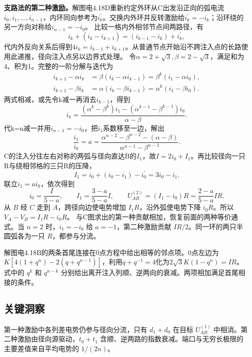 \documentclass[UTF8,fontset=fandol,a4paper,11pt]{ctexart}
\begin{document}
\textbf{支路法的第二种激励。}解图电4.18D重新约定外环从C出发沿正向的弧电流$i_0,i_1,\ldots,i_{n-1}$，内环同向参考为$i_k^{\prime}$。交换内外环并反转激励给$i_k^{\prime}=-i_k$；沿环绕的另一方向对称给$i_{n-1}=-i_0$。
比较一格内外相邻节点间两路径，有
\[
i_k+(i_k-i_{k+1})=(i_{k-1}-i_k)+i_k^{\prime},
\]
代内外反向关系后得到$4i_k=i_{k-1}+i_{k+1}$。从普通节点开始沿不跨注入点的长路使用此递推，径向注入点另以边界式处理。
令$\alpha=2+\sqrt3,\beta=2-\sqrt3$，满足和为4、积为1。完整的一阶分解与迭代为
\begin{align*}
i_{k+1}-\alpha i_k&=\beta(i_k-\alpha i_{k-1})=\beta^k(i_1-\alpha i_0),\\
i_{k+1}-\beta i_k&=\alpha(i_k-\beta i_{k-1})=\alpha^k(i_1-\beta i_0).
\end{align*}
两式相减，或先令k减一再消去$i_{k-1}$，得到
\[
i_k=\frac{(\alpha^k-\beta^k)i_1-(\alpha^{k-1}-\beta^{k-1})i_0}{\alpha-\beta}.
\]
代k=n减一并用$i_{n-1}=-i_0$，把$i_1$系数移至一边，解出
\[
\frac{i_1}{i_0}=a=
\frac{\alpha^{n-2}-\beta^{n-2}-(\alpha-\beta)}{\alpha^{n-1}-\beta^{n-1}}.
\]
C的注入分往左右对称的两弧与径向直达B的$I_1$，故$I=2i_0+I_1$。再比较径向一只R与绕相邻格的三只R的压降，
\[
I_1=i_0+(i_0-i_1)-i_0^{\prime}=3i_0-i_1.
\]
联立$i_1=a i_0$，依次得到
\[
i_0=\frac{I}{5-a},\qquad I_1=\frac{3-a}{5-a}I,\qquad
U_{AB}^{(2)}=(I_1-i_0)R=\frac{2-a}{5-a}IR.
\]
从 $B$ 经 $C$ 走到 $A$，跨径向边使电势增加 $I_1R$，沿外弧使电势下降 $i_0R$。所以 $V_A-V_B=I_1R-i_0R$。
与C图求出的第一种贡献相加，恢复前面的两种等价通式。当 $n=2$ 时，$i_1=-i_0$ 给 $a=-1$，第二种激励贡献 $IR/2$。同一环的两只半圆弧各为一只 $R$，都参与分流。

解图电4.18B的两条首尾连接在0点方程中给出相等的邻点项。0点左边为$K[4(1+q^n)-2(q+q^{n-1})]$，利用$q+q^{-1}=4$化为$2\sqrt3K(1-q^n)=IR$。
式中的 $q^k$ 和 $q^{n-k}$ 分别给出离开注入列顺、逆两向的衰减。两项相加满足首尾相接的条件。




\subsection*{关键洞察}

第一种激励中各列差电势仍参与径向分流，只有 $d_1+d_0$ 在目标 $U_{AB}^{(1)}$ 中相消。第二种激励由径向源驱动，$t_0+t_1$ 含顺、逆两路的指数衰减。端口与无穷长极限的主要差值来自平均电势的 $1/(2n)$。


\end{document}
